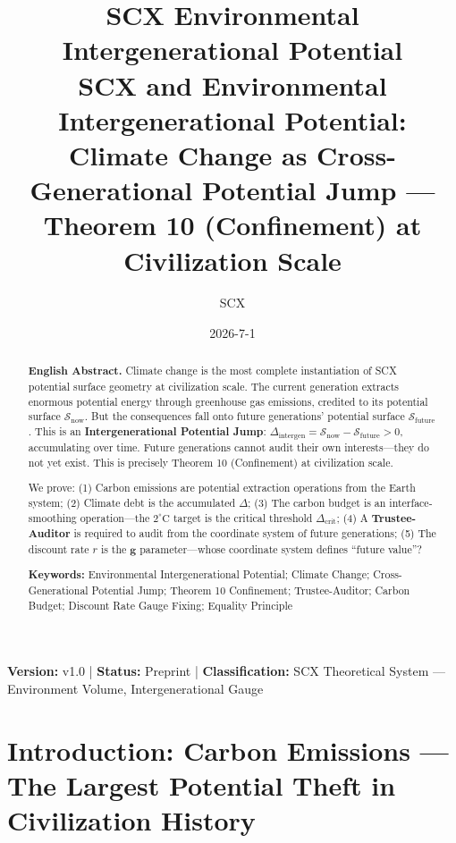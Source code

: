 \documentclass[12pt,a4paper]{article}
\title{\textbf{\LARGE SCX Environmental Intergenerational Potential}\\[6pt]
\large SCX and Environmental Intergenerational Potential:\\
Climate Change as Cross-Generational Potential Jump --- \\
Theorem 10 (Confinement) at Civilization Scale}\\[12pt]
\author{SCX}\\[4pt]
\date{2026-7-1}
\theoremstyle{remark}
\newcommand{\GenS}{\mathcal{S}}
\newcommand{\GParam}{\mathbf{g}}
\begin{document}
\maketitle
\begin{center}
\footnotesize
\textbf{Version: } v1.0 \quad | \quad
\textbf{Status:} Preprint \quad | \quad
\textbf{Classification:} SCX Theoretical System --- Environment Volume, Intergenerational Gauge
\end{center}
\begin{abstract}
\medskip
\noindent\textbf{English Abstract.}
Climate change is the most complete instantiation of SCX potential surface geometry at civilization scale. The current generation extracts enormous potential energy through greenhouse gas emissions, credited to its potential surface \(\GenS_{\text{now}}\). But the consequences fall onto future generations' potential surface \(\GenS_{\text{future}}\). This is an \textbf{Intergenerational Potential Jump}: \(\Delta_{\text{intergen}} = \GenS_{\text{now}} - \GenS_{\text{future}} > 0\), accumulating over time. Future generations cannot audit their own interests---they do not yet exist. This is precisely Theorem 10 (Confinement) at civilization scale.

We prove: (1) Carbon emissions are potential extraction operations from the Earth system; (2) Climate debt is the accumulated \(\Delta\); (3) The carbon budget is an interface-smoothing operation---the \(2^\circ\text{C}\) target is the critical threshold \(\Delta_{\text{crit}}\); (4) A \textbf{Trustee-Auditor} is required to audit from the coordinate system of future generations; (5) The discount rate \(r\) is the \(\GParam\) parameter---whose coordinate system defines ``future value''?

\medskip
\noindent\textbf{Keywords:} Environmental Intergenerational Potential; Climate Change; Cross-Generational Potential Jump; Theorem 10 Confinement; Trustee-Auditor; Carbon Budget; Discount Rate Gauge Fixing; Equality Principle
\end{abstract}
\tableofcontents
\section{Introduction: Carbon Emissions --- The Largest Potential Theft in Civilization History}
\end{document}

